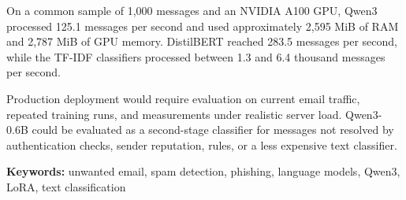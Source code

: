 On a common sample of 1,000 messages and an NVIDIA A100 GPU, Qwen3 processed
125.1 messages per second and used approximately 2,595 MiB of RAM and 2,787
MiB of GPU memory. DistilBERT reached 283.5 messages per second, while the
TF-IDF classifiers processed between 1.3 and 6.4 thousand messages per second.

Production deployment would require evaluation on current email traffic,
repeated training runs, and measurements under realistic server load.
Qwen3-0.6B could be evaluated as a second-stage classifier for messages not
resolved by authentication checks, sender reputation, rules, or a less
expensive text classifier.

\medskip
\noindent\textbf{Keywords:} unwanted email, spam detection, phishing, language
models, Qwen3, LoRA, text classification
\endgroup
